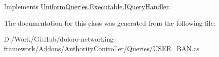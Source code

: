 Implements \mbox{\hyperlink{interface_uniform_queries_1_1_executable_1_1_i_query_handler_a0f43184bf3e306a7cbebc39098f044ee}{Uniform\+Queries.\+Executable.\+I\+Query\+Handler}}.



The documentation for this class was generated from the following file\+:\begin{DoxyCompactItemize}
\item 
D\+:/\+Work/\+Git\+Hub/doloro-\/networking-\/framework/\+Addons/\+Authority\+Controller/\+Queries/U\+S\+E\+R\+\_\+\+B\+A\+N.\+cs\end{DoxyCompactItemize}
